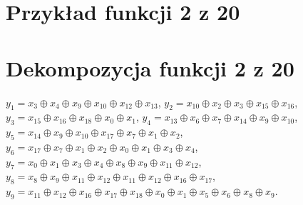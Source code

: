 \section*{Przykład funkcji 2 z 20}
\label{file:2outof20.pla}

\clearpage

\section*{Dekompozycja funkcji 2 z 20}
\label{file:2outof20.txt}
\noindent
$y_1 = x_3 \oplus x_4 \oplus x_9 \oplus x_10 \oplus x_12 \oplus x_13$, \newline
$y_2 = x_10 \oplus x_2 \oplus x_3 \oplus x_15 \oplus x_16$, \newline
$y_3 = x_15 \oplus x_16 \oplus x_18 \oplus x_0 \oplus x_1$,  \newline
$y_4 = x_13 \oplus x_6 \oplus x_7 \oplus x_14 \oplus x_9 \oplus x_10$,  \newline
$y_5 = x_14 \oplus x_9 \oplus x_10 \oplus x_17 \oplus x_7 \oplus x_1 \oplus x_2$,  \newline
$y_6 = x_17 \oplus x_7 \oplus x_1 \oplus x_2 \oplus x_0 \oplus x_1 \oplus x_3 \oplus x_4$,  \newline
$y_7 = x_0 \oplus x_1 \oplus x_3 \oplus x_4 \oplus x_8 \oplus x_9 \oplus x_11 \oplus x_12$,  \newline
$y_8 = x_8 \oplus x_9 \oplus x_11 \oplus x_12 \oplus x_11 \oplus x_12 \oplus x_16 \oplus x_17$,  \newline
$y_9 = x_11 \oplus x_12 \oplus x_16 \oplus x_17 \oplus x_18 \oplus x_0 \oplus x_1 \oplus x_5 \oplus x_6 \oplus x_8 \oplus x_9$. \newline

\clearpage